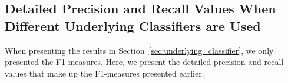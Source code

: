 

\clearpage
\subsection*{Detailed Precision and Recall Values When Different Underlying Classifiers are Used}

When presenting the results in Section~\ref{sec:underlying_classifier}, we only presented the F1-measures. Here, we present the detailed precision and recall values that make up the F1-measures presented earlier.

